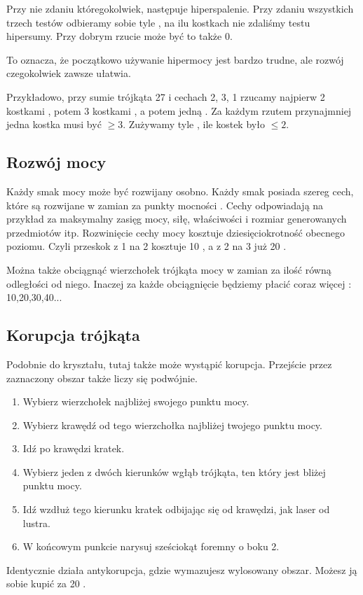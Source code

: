 Przy nie zdaniu któregokolwiek, następuje hiperspalenie.
Przy zdaniu wszystkich trzech testów odbieramy sobie tyle \abkar{}, na ilu kostkach nie zdaliśmy testu hipersumy. Przy dobrym rzucie może być to także 0.

To oznacza, że początkowo używanie hipermocy jest bardzo trudne, ale rozwój czegokolwiek zawsze ułatwia.

Przykładowo, przy sumie trójkąta 27 i cechach 2, 3, 1 rzucamy najpierw 2 kostkami \dx{}, potem 3 kostkami \dx{}, a potem jedną \dx{}. Za każdym rzutem przynajmniej jedna kostka musi być $\ge3$.
Zużywamy tyle \abkar{}, ile kostek było $\le2$.

\subsection{Rozwój mocy}
Każdy smak mocy może być rozwijany osobno.
Każdy smak posiada szereg cech, które są rozwijane w zamian za punkty mocności \xpmcn{}.
Cechy odpowiadają na przykład za maksymalny zasięg mocy, siłę, właściwości i rozmiar generowanych przedmiotów itp.
Rozwinięcie cechy mocy kosztuje dziesięciokrotność \xpmcn{} obecnego poziomu.
Czyli przeskok z 1 na 2 kosztuje 10 \xpmcn{}, a z 2 na 3 już 20 \xpmcn{}.

Można także obciągnąć wierzchołek trójkąta mocy w zamian za ilość \xpmcn{} równą odległości od niego. 
Inaczej za każde obciągnięcie będziemy płacić coraz więcej \xpmcn{}: 10,20,30,40...

\subsection{Korupcja trójkąta}
Podobnie do kryształu, tutaj także może wystąpić korupcja.
Przejście przez zaznaczony obszar także liczy się podwójnie.
\begin{enumerate}
 \item Wybierz wierzchołek najbliżej swojego punktu mocy.
 \item Wybierz krawędź od tego wierzchołka najbliżej twojego punktu mocy.
 \item Idź po krawędzi \dxx{} kratek.
 \item Wybierz jeden z dwóch kierunków wgłąb trójkąta, ten który jest bliżej punktu mocy.
 \item Idź wzdłuż tego kierunku \dxx[5]{} kratek odbijając się od krawędzi, jak laser od lustra.
 \item W końcowym punkcie narysuj sześciokąt foremny o boku 2.
\end{enumerate}
Identycznie działa antykorupcja, gdzie wymazujesz wylosowany obszar. Możesz ją sobie kupić za 20 \xpmcn{}.


